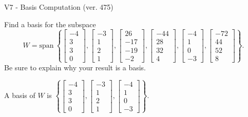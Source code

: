\begin{exercise}
  \begin{exerciseTitle}V7 - Basis Computation (ver. 475)\end{exerciseTitle}
  \begin{exerciseStatement}
    Find a basis for the subspace 
\[W=\mathrm{span}\ \left\{\left[\begin{array}{r}
-4 \\
3 \\
3 \\
0
\end{array}\right] , \left[\begin{array}{r}
-3 \\
1 \\
2 \\
1
\end{array}\right] , \left[\begin{array}{r}
26 \\
-17 \\
-19 \\
-2
\end{array}\right] , \left[\begin{array}{r}
-44 \\
28 \\
32 \\
4
\end{array}\right] , \left[\begin{array}{r}
-4 \\
1 \\
0 \\
-3
\end{array}\right] , \left[\begin{array}{r}
-72 \\
44 \\
52 \\
8
\end{array}\right]\right\}.\]
 Be sure to explain why your result is a basis.


  \end{exerciseStatement}
  \begin{exerciseAnswer}
   A basis of \(W\) is  \(\left\{\left[\begin{array}{r}
-4 \\
3 \\
3 \\
0
\end{array}\right] , \left[\begin{array}{r}
-3 \\
1 \\
2 \\
1
\end{array}\right] , \left[\begin{array}{r}
-4 \\
1 \\
0 \\
-3
\end{array}\right]\right\}\).
  


  \end{exerciseAnswer}
\end{exercise}
